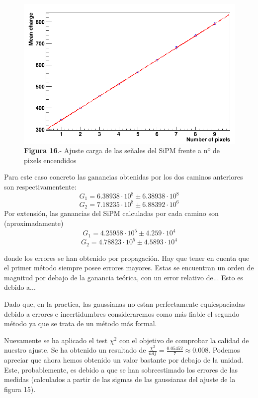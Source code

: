 \begin{enumerate}
\begin{enumerate}
	\begin{figure}[hbtp]
		\centering
		\includegraphics[scale=0.4]{FitPosicionPixels.png}
		\caption{\textbf{Figura 16}.- Ajuste carga de las señales del SiPM frente a nº de pixels encendidos}
		\end{figure}
			
	\end{enumerate}
	
Para este caso concreto las ganancias obtenidas por los dos caminos anteriores son respectivamentente:
\begin{equation}
G_1= 6.38938 \cdot 10^8 \pm  6.38938 \cdot 10^8
\label{gananciatotalmetodo1} 
\end{equation}
\begin{equation}
G_2=7.18235 \cdot 10^8 \pm 6.88392 \cdot 10^6
\label{gananciatotalmetodo2}
\end{equation}
Por extensión, las ganancias del SiPM calculadas por cada camino son (aproximadamente) 
\begin{equation}
G_1= 4.25958 \cdot 10^5 \pm 4.259 \cdot 10^4
\label{gananciaSiPMmetodo1}
\end{equation}
\begin{equation}
G_2= 4.78823 \cdot 10^5 \pm 4.5893 \cdot 10^4
\label{gananciaSiPMmetodo2}
\end{equation}

donde los errores se han obtenido por propagación. Hay que tener en cuenta que el primer método siempre posee errores mayores. Estas se encuentran un orden de magnitud por debajo de la ganancia teórica, con un error relativo de... Esto es debido a...

Dado que, en la practica, las gaussianas no estan perfectamente equiespaciadas debido a errores e incertidumbres consideraremos como más fiable el segundo método ya que se trata de un método más formal. 

Nuevamente se ha aplicado el test $\chi^2$ con el objetivo de comprobar la calidad de nuestro ajuste. Se ha obtenido un resultado de $\frac{\chi^2}{ndf}=\frac{0.05452}{7}\approx 0.008$. Podemos apreciar que ahora hemos obtenido un valor bastante por debajo de la unidad. Este, probablemente, es debido a que se han sobreestimado los errores de las medidas (calculados a partir de las sigmas de las gaussianas del ajuste de la figura 15).

\end{enumerate}